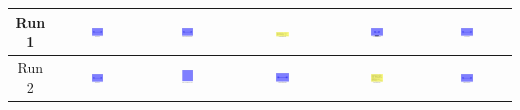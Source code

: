 \begin{table}[H]
\begin{tabular}{|c|c|c|c|c|c|}
    Run 1 & \includegraphics[width=0.15\textwidth]{./run_1/png/gpt-4o_results/MicrofluidicChip.png} & \includegraphics[width=0.15\textwidth]{./run_1/png/claude-3-5-sonnet-20240620_results/MicrofluidicChip.png} & \includegraphics[width=0.15\textwidth]{./run_1/png/watsonx_meta-llama_llama-3-1-70b-instruct_results/MicrofluidicChip.png} & \includegraphics[width=0.15\textwidth]{./run_1/png/watsonx_meta-llama_llama-3-405b-instruct_results/MicrofluidicChip.png} & \includegraphics[width=0.15\textwidth]{./run_1/png/o1-preview_results/MicrofluidicChip.png} \\
    \hline
    Run 2 & \includegraphics[width=0.15\textwidth]{./run_2/png/gpt-4o_results/MicrofluidicChip.png} & \includegraphics[width=0.15\textwidth]{./run_2/png/claude-3-5-sonnet-20240620_results/MicrofluidicChip.png} & \includegraphics[width=0.15\textwidth]{./run_2/png/watsonx_meta-llama_llama-3-1-70b-instruct_results/MicrofluidicChip.png} & \includegraphics[width=0.15\textwidth]{./run_2/png/watsonx_meta-llama_llama-3-405b-instruct_results/MicrofluidicChip.png} & \includegraphics[width=0.15\textwidth]{./run_2/png/o1-preview_results/MicrofluidicChip.png} \\

\end{tabular}
\end{table}

